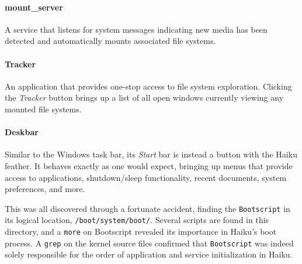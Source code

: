 \documentclass{article}
\begin{document}
\paragraph{mount\_server}
A service that listens for system messages indicating new media has
been detected and automatically mounts associated
file systems.\cite{AutoMounter}

\paragraph{Tracker}
An application that provides one-stop access to file system
exploration. Clicking the \textit{Tracker} button brings up a list of
all open windows currently viewing any mounted file
systems.\cite{Tracker}

\paragraph{Deskbar}
Similar to the Windows task bar, its \textit{Start} bar is instead a
button with the Haiku feather. It behaves exactly as one would expect,
bringing up menus that provide access to applications, shutdown/sleep
functionality, recent documents, system preferences, and
more.\cite{Deskbar}

This was all discovered through a fortunate accident, finding
the \texttt{Bootscript} in its logical
location, \texttt{/boot/system/boot/}. Several scripts are found in
this directory, and a \texttt{more} on Bootscript revealed its
importance in Haiku's boot process. A \texttt{grep} on the kernel
source files confirmed that \texttt{Bootscript} was indeed solely
responsible for the order of application and service initialization in
Haiku.

{}

\end{document}
